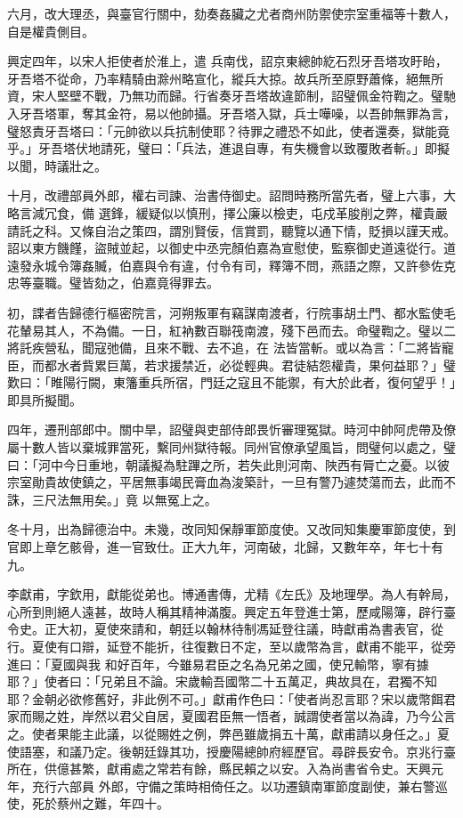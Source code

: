 \begin{pinyinscope}
 六月，改大理丞，與臺官行關中，劾奏姦臟之尤者商州防禦使宗室重福等十數人，自是權貴側目。



 興定四年，以宋人拒使者於淮上，遣
 兵南伐，詔京東總帥紇石烈牙吾塔攻盱眙，牙吾塔不從命，乃率精騎由滁州略宣化，縱兵大掠。故兵所至原野蕭條，絕無所資，宋人堅壁不戰，乃無功而歸。行省奏牙吾塔故違節制，詔璧佩金符鞫之。璧馳入牙吾塔軍，奪其金符，易以他帥攝。牙吾塔入獄，兵士嘩噪，以吾帥無罪為言，璧怒責牙吾塔曰：「元帥欲以兵抗制使耶？待罪之禮恐不如此，使者還奏，獄能竟乎。」牙吾塔伏地請死，璧曰：「兵法，進退自專，有失機會以致覆敗者斬。」即擬以聞，時議壯之。



 十月，改禮部員外郎，權右司諫、治書侍御史。詔問時務所當先者，璧上六事，大略言減冗食，備
 選鋒，緩疑似以慎刑，擇公廉以檢吏，屯戍革朘削之弊，權貴嚴請託之科。又條自治之策四，謂別賢佞，信賞罰，聽覽以通下情，貶損以謹天戒。詔以東方饑饉，盜賊並起，以御史中丞完顏伯嘉為宣慰使，監察御史道遠從行。道遠發永城令簿姦贓，伯嘉與令有違，付令有司，釋簿不問，燕語之際，又許參佐克忠等臺職。璧皆劾之，伯嘉竟得罪去。



 初，諜者告歸德行樞密院言，河朔叛軍有竊謀南渡者，行院事胡土門、都水監使毛花輦易其人，不為備。一日，紅衲數百聯筏南渡，殘下邑而去。命璧鞫之。璧以二將託疾營私，聞寇弛備，且來不戰、去不追，在
 法皆當斬。或以為言：「二將皆寵臣，而都水者貲累巨萬，若求援禁近，必從輕典。君徒結怨權貴，果何益耶？」璧歎曰：「睢陽行闕，東籓重兵所宿，門廷之寇且不能禦，有大於此者，復何望乎！」即具所擬聞。



 四年，遷刑部郎中。關中旱，詔璧與吏部侍郎畏忻審理冤獄。時河中帥阿虎帶及僚屬十數人皆以棄城罪當死，繫同州獄待報。同州官僚承望風旨，問璧何以處之，璧曰：「河中今日重地，朝議擬為駐蹕之所，若失此則河南、陜西有脣亡之憂。以彼宗室勛貴故使鎮之，平居無事竭民膏血為浚築計，一旦有警乃遽焚蕩而去，此而不誅，三尺法無用矣。」竟
 以無冤上之。



 冬十月，出為歸德治中。未幾，改同知保靜軍節度使。又改同知集慶軍節度使，到官即上章乞骸骨，進一官致仕。正大九年，河南破，北歸，又數年卒，年七十有九。



 李獻甫，字欽用，獻能從弟也。博通書傳，尤精《左氏》及地理學。為人有幹局，心所到則絕人遠甚，故時人稱其精神滿腹。興定五年登進士第，歷咸陽簿，辟行臺令史。正大初，夏使來請和，朝廷以翰林待制馮延登往議，時獻甫為書表官，從行。夏使有口辯，延登不能折，往復數日不定，至以歲幣為言，獻甫不能平，從旁進曰：「夏國與我
 和好百年，今雖易君臣之名為兄弟之國，使兄輸幣，寧有據耶？」使者曰：「兄弟且不論。宋歲輸吾國幣二十五萬疋，典故具在，君獨不知耶？金朝必欲修舊好，非此例不可。」獻甫作色曰：「使者尚忍言耶？宋以歲幣餌君家而賜之姓，岸然以君父自居，夏國君臣無一悟者，誠謂使者當以為諱，乃今公言之。使者果能主此議，以從賜姓之例，弊邑雖歲捐五十萬，獻甫請以身任之。」夏使語塞，和議乃定。後朝廷錄其功，授慶陽總帥府經歷官。尋辟長安令。京兆行臺所在，供億甚繁，獻甫處之常若有餘，縣民賴之以安。入為尚書省令史。天興元年，充行六部員
 外郎，守備之策時相倚任之。以功遷鎮南軍節度副使，兼右警巡使，死於蔡州之難，年四十。




\end{pinyinscope}
